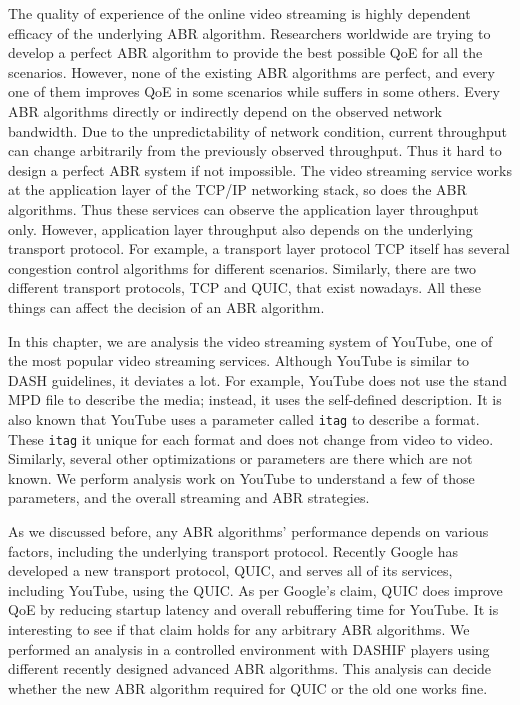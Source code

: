 
The quality of experience of the online video streaming is highly dependent efficacy of the underlying ABR algorithm. Researchers worldwide are trying to develop a perfect ABR algorithm to provide the best possible QoE for all the scenarios. However, none of the existing ABR algorithms are perfect, and every one of them improves QoE in some scenarios while suffers in some others. Every ABR algorithms directly or indirectly depend on the observed network bandwidth. Due to the unpredictability of network condition, current throughput can change arbitrarily from the previously observed throughput. Thus it hard to design a perfect ABR system if not impossible. The video streaming service works at the application layer of the TCP/IP networking stack, so does the ABR algorithms. Thus these services can observe the application layer throughput only. However, application layer throughput also depends on the underlying transport protocol. For example, a transport layer protocol TCP itself has several congestion control algorithms for different scenarios. Similarly, there are two different transport protocols, TCP and QUIC, that exist nowadays. All these things can affect the decision of an ABR algorithm.

In this chapter, we are analysis the video streaming system of YouTube, one of the most popular video streaming services. Although YouTube is similar to DASH guidelines, it deviates a lot. For example, YouTube does not use the stand MPD file to describe the media; instead, it uses the self-defined description. It is also known that YouTube uses a parameter called {\tt itag} to describe a format. These {\tt itag} it unique for each format and does not change from video to video. Similarly, several other optimizations or parameters are there which are not known. We perform analysis work on YouTube to understand a few of those parameters, and the overall streaming and ABR strategies.

As we discussed before, any ABR algorithms' performance depends on various factors, including the underlying transport protocol. Recently Google has developed a new transport protocol, QUIC, and serves all of its services, including YouTube, using the QUIC. As per Google's claim, QUIC does improve QoE by reducing startup latency and overall rebuffering time for YouTube. It is interesting to see if that claim holds for any arbitrary ABR algorithms. We performed an analysis in a controlled environment with DASHIF players using different recently designed advanced ABR algorithms. This analysis can decide whether the new ABR algorithm required for QUIC or the old one works fine.

